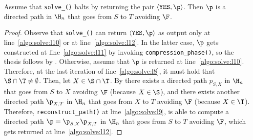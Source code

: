 \begin{proposition}\label{prop:correctness_yes}
Assume that \texttt{solve\_\mainproblem()} halts by returning the pair $\langle \texttt{YES}, \p\rangle$.
Then $\p$ is a directed path in $\H_n$ that goes from $S$ to $T$ avoiding $\F$.
\end{proposition}
\begin{proof}
Observe that \texttt{solve\_\mainproblem()} can return $\langle\texttt{YES}, \p\rangle$
as output only at line~\ref{algo:solve:l10} or at line~\ref{algo:solve:l12}.
In the latter case, $\p$ gets constructed at line~\ref{algo:solve:l11} by invoking \texttt{compression\_phase()},
so the thesis follows by .
Otherwise, assume that $\p$ is returned at line~\ref{algo:solve:l10}.
Therefore, at the last iteration of line~\ref{algo:solve:l8}, it must hold that $\S\cap\T\neq\emptyset$.
Then, let $X\in\S\cap\T$.
By  there exists a directed path $p_{S,X}$ in $\H_n$ that goes from
$S$ to $X$ avoiding $\F$ (because $X\in\S$),
and there exists another directed path $\p_{X,T}$ in $\H_n$ that goes from $X$ to $T$ avoiding $\F$ (because $X\in\T$).
Therefore, \texttt{reconstruct\_path()} at line~\ref{algo:solve:l9},
is able to compute a directed path $\p=\p_{S,X}\p_{X,T}$ in $\H_n$ that goes from $S$ to $T$
avoiding $\F$, which gets returned at line~\ref{algo:solve:l12}.
\end{proof}

